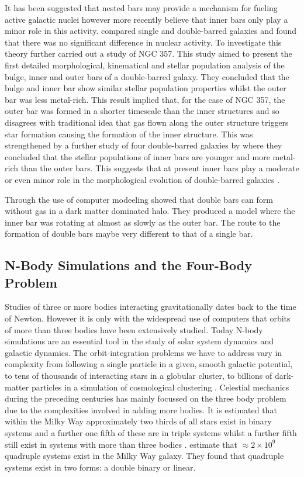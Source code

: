 \documentclass[a4paper,12pt]{article}
\begin{document}
It has been suggested that nested bars may provide a mechanism for fueling active galactic nuclei \citep{shlosman} however more recently \citep{erwin3} believe that inner bars only play a minor role in this 
activity. \citep{erwin1} compared single and double-barred galaxies and found that there was no significant difference in nuclear activity. To investigate this theory further \cite{lorenzo1} carried out a 
study of NGC 357. This study aimed to present the first detailed morphological, kinematical and stellar population analysis of the bulge, inner and outer bars of a double-barred galaxy. They concluded that
the bulge and inner bar show similar stellar population properties whilst the outer bar was less metal-rich. This result implied that, for the case of NGC 357, the outer bar was formed in a shorter timescale than
the inner structures and so disagrees with traditional idea that gas flown along the outer structure triggers star formation causing the formation of the inner structure. This was strengthened by a further study of
four double-barred galaxies by \cite{lorenzo2} where they concluded that the stellar populations of inner bars are younger and more metal-rich than the outer bars. This suggests that at present inner bars play a
moderate or even minor role in the morphological evolution of double-barred galaxies \citep{lorenzo2}.

Through the use of computer modeeling \cite{saha} showed that double bars can form without gas in a dark matter dominated halo. They produced a model where the inner bar was rotating at almost as slowly as the 
outer bar. The route to the formation of double bars maybe very different to that of a single bar.

\subsection{N-Body Simulations and the Four-Body Problem}
Studies of three or more bodies interacting gravitationally dates back to the time of Newton. However it is only with the widespread use of computers that orbits of more than three bodies have been extensively studied. Today
N-body simulations are an essential tool in the study of solar system dynamics and galactic dynamics. The orbit-integration problems we have to address
vary in complexity from following a single particle in a given, smooth galactic potential, to tens of thousands of interacting stars in a globular cluster, to billions of dark-matter particles in a 
simulation of cosmological clustering \citep{binney}. Celestial mechanics during the preceding centuries has mainly focussed on the three body problem
due to the complexities involved in adding more bodies. It is estimated that within the Milky Way approximately two thirds of all stars exist in binary systems and a further one fifth of these are in triple systems whilst a
further fifth still exist in systems with more than three bodies \citep{steves}. \cite{steves} estimate that $\approx2\times10^9$ quadruple systems exist in the Milky Way galaxy. They found that quadruple systems exist in two
forms: a double binary or linear.
\end{document}
